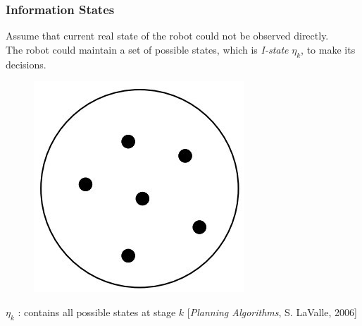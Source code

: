 \documentclass[compress]{beamer}
\begin{document}
\begin{frame}\frametitle{Information States}
Assume that current real state of the robot could not be observed directly. \\

The robot could maintain a set of possible states, which is \emph{I-state} $\eta_k$,
 to make its decisions.
\begin{description}
\item
 \begin{figure}
    \includegraphics[scale=0.3]{xk.jpg}
    \end{figure}
 \item $\eta_k$ : contains all possible states at stage $k$ [\emph{Planning Algorithms}, S. LaValle, 2006]
 \end{description}
%
%
%

\transboxout
\end{frame}
\end{document}
